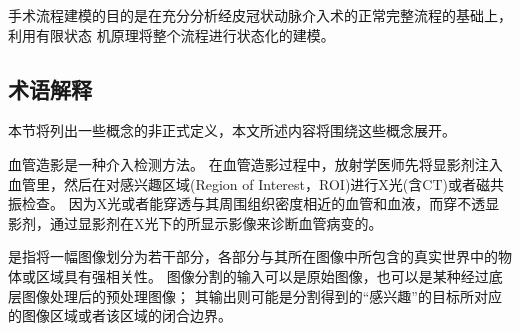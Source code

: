 手术流程建模的目的是在充分分析经皮冠状动脉介入术的正常完整流程的基础上，利用有限状态
机原理将整个流程进行状态化的建模。

\subsection{术语解释}
\label{sec1-1-2}

本节将列出一些概念的非正式定义，本文所述内容将围绕这些概念展开。


\begin{definition}[血管造影]
血管造影是一种介入检测方法。
在血管造影过程中，放射学医师先将显影剂注入血管里，然后在对感兴趣区域(Region of Interest，ROI)进行X光(含CT)或者磁共振检查。
因为X光或者能穿透与其周围组织密度相近的血管和血液，而穿不透显影剂，通过显影剂在X光下的所显示影像来诊断血管病变的。
\end{definition}

\begin{definition}[经皮介入血管成形术]
\end{definition}

\begin{definition}[图像分割]
是指将一幅图像划分为若干部分，各部分与其所在图像中所包含的真实世界中的物体或区域具有强相关性。
图像分割的输入可以是原始图像，也可以是某种经过底层图像处理后的预处理图像；
其输出则可能是分割得到的“感兴趣”的目标所对应的图像区域或者该区域的闭合边界\cite{Sonka2008ImageBook}\cite{Wang2008ImageBook}。
\end{definition}

